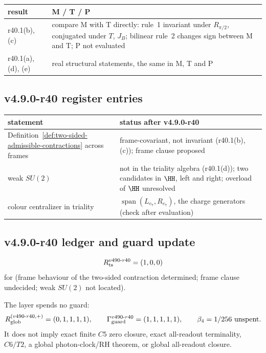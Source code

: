 \begin{center}
\small
\begin{tabular}{@{}>{\raggedright\arraybackslash}p{}>{\raggedright\arraybackslash}p{}@{}}
\toprule
result & M / T / P\\
\midrule
r40.1(b), (c) & compare M with T directly: rule~1 invariant under \(R_{\pi/2}\), conjugated under \(T\), \(J_B\); bilinear rule~2 changes sign between M and T; P not evaluated\\
r40.1(a), (d), (e) & real structural statements, the same in M, T and P\\
\bottomrule
\end{tabular}
\end{center}

\subsection*{v4.9.0-r40 register entries}
\label{subsec:v490-r40-register}

\begin{center}
\small
\begin{tabular}{@{}>{\raggedright\arraybackslash}p{}>{\raggedright\arraybackslash}p{}@{}}
\toprule
statement & status after v4.9.0-r40\\
\midrule
Definition~\ref{def:two-sided-admissible-contractions} across frames & frame-covariant, not invariant (r40.1(b), (c)); frame clause proposed\\
weak \(SU(2)\) & not in the triality algebra (r40.1(d)); two candidates in \(\HH\), left and right; overload of \(\HH\) unresolved\\
colour centralizer in triality & \(\operatorname{span}(L_{e_7},R_{e_7})\), the charge generators (check after evaluation)\\
\bottomrule
\end{tabular}
\end{center}

\subsection*{v4.9.0-r40 ledger and guard update}
\label{subsec:v490-r40-ledger-guard}

\[
R_{\rm ts}^{v490\text{-}r40}=(1,0,0)
\]
for (frame behaviour of the two-sided contraction determined; frame clause undecided; weak \(SU(2)\) not located).

The layer spends no guard:
\[
R_{\rm glob}^{(v490\text{-}r40,+)}=(0,1,1,1,1),
\qquad
\Gamma_{\rm guard}^{v490\text{-}r40}=(1,1,1,1,1),
\qquad
\beta_4=1/256\ \text{unspent}.
\]
It does not imply exact finite \(C5\) zero closure, exact all-readout terminality,
\(C6/T2\), a global photon-clock/RH theorem, or global all-readout closure.
